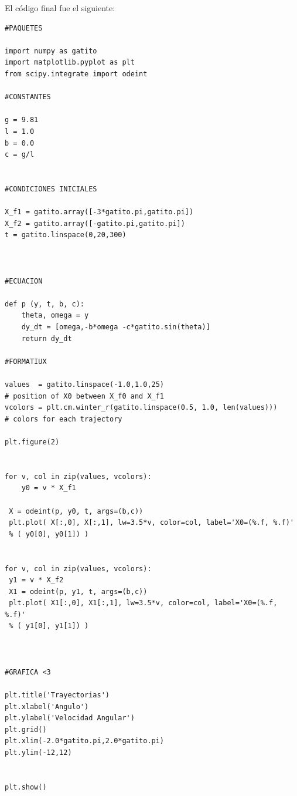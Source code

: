 \documentclass[12pt,letterpaper]{article}
\begin{document}
El código final fue el siguiente:
\begin{verbatim}
#PAQUETES

import numpy as gatito
import matplotlib.pyplot as plt
from scipy.integrate import odeint

#CONSTANTES

g = 9.81
l = 1.0
b = 0.0 
c = g/l


#CONDICIONES INICIALES

X_f1 = gatito.array([-3*gatito.pi,gatito.pi])
X_f2 = gatito.array([-gatito.pi,gatito.pi])
t = gatito.linspace(0,20,300)



#ECUACION

def p (y, t, b, c):
    theta, omega = y
    dy_dt = [omega,-b*omega -c*gatito.sin(theta)]
    return dy_dt

#FORMATIUX

values  = gatito.linspace(-1.0,1.0,25)       
# position of X0 between X_f0 and X_f1
vcolors = plt.cm.winter_r(gatito.linspace(0.5, 1.0, len(values)))  
# colors for each trajectory

plt.figure(2)


for v, col in zip(values, vcolors):
    y0 = v * X_f1                              
    
 X = odeint(p, y0, t, args=(b,c))         
 plt.plot( X[:,0], X[:,1], lw=3.5*v, color=col, label='X0=(%.f, %.f)' 
 % ( y0[0], y0[1]) )

                              
for v, col in zip(values, vcolors):
 y1 = v * X_f2                           
 X1 = odeint(p, y1, t, args=(b,c))           
 plt.plot( X1[:,0], X1[:,1], lw=3.5*v, color=col, label='X0=(%.f, %.f)'
 % ( y1[0], y1[1]) )



#GRAFICA <3

plt.title('Trayectorias')
plt.xlabel('Angulo')
plt.ylabel('Velocidad Angular')
plt.grid()
plt.xlim(-2.0*gatito.pi,2.0*gatito.pi)
plt.ylim(-12,12)


plt.show()
\end{verbatim}
\end{document}
